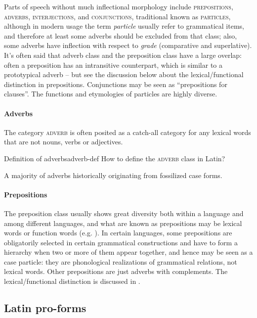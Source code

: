\documentclass[a4paper, oneside, 12pt]{report}
\newcommand*{\term}[1]{\emph{#1}}
\newcommand*{\category}[1]{\textsc{#1}}
\begin{document}
Parts of speech without much inflectional morphology include \category{prepositions}, \category{adverbs},
\category{interjections}, and \category{conjunctions},
traditional known as \category{particles}, 
although in modern usage the term \term{particle}
usually refer to grammatical items, 
and therefore at least some adverbs should be excluded from that class;  
also, some adverbs have inflection with respect to \emph{grade} 
(comparative and superlative).
It's often said that adverb class and the preposition class have a large overlap:
often a preposition has an intransitive counterpart,
which is similar to a prototypical adverb -- 
but see the discussion below about the lexical/functional distinction in prepositions.
Conjunctions may be seen as ``prepositions for clauses''.
The functions and etymologies of particles are highly diverse.

\paragraph*{Adverbs}
The category \category{adverb} is often posited as a catch-all category
for any lexical words that are not nouns, verbs or adjectives.

\begin{todobox}{Definition of adverbs}{adverb-def}
    How to define the \category{adverb} class in Latin?
\end{todobox}

A majority of adverbs historically originating from fossilized case forms.

\paragraph*{Prepositions}
\label{sec:grammatical.pos.preposition}

The preposition class usually shows great diversity  
both within a language and among different languages,
and what are known as prepositions may be lexical words or function words 
(e.g. \citealt{garzonio2021functional}).
In certain languages, some prepositions are obligatorily selected in certain grammatical constructions
and have to form a hierarchy when two or more of them appear together,
and hence may be seen as a case particle:
they are phonological realizations of grammatical relations, not lexical words.
Other prepositions are just adverbs with complements.
The lexical/functional distinction is discussed in 
.

\subsection{Latin pro-forms}
\end{document}
